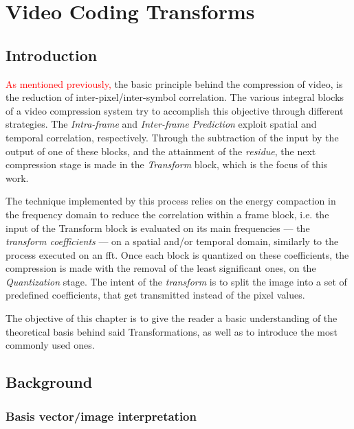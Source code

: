 \cleardoublepage
\chapter{Video Coding Transforms}

\section{{Introduction}}

\textcolor{red}{As mentioned previously,} the basic principle behind the compression of video, is the reduction of inter-pixel/inter-symbol correlation. The various integral blocks of a video compression system try to accomplish this objective through different strategies. The \emph{Intra-frame} and \emph{Inter-frame Prediction} exploit spatial and temporal correlation, respectively. Through the subtraction of the input by the output of one of these blocks, and the attainment of the \emph{residue}, the next compression stage is made in the \emph{Transform} block, which is the focus of this work.


The technique implemented by this process relies on the energy compaction in the frequency domain to reduce the correlation within a frame block, i.e. the input of the Transform block is evaluated on its main frequencies --- the \emph{transform coefficients} --- on a spatial and/or temporal domain, similarly to the process executed on an \gls{fft}. Once each block is quantized on these coefficients, the compression is made with the removal of the least significant ones, on the \emph{Quantization} stage. The intent of the \emph{transform} is to split the image into a set of predefined coefficients, that get transmitted instead of the pixel values.

The objective of this chapter is to give the reader a basic understanding of the theoretical basis behind said Transformations, as well as to introduce the most commonly used ones. 

\section{Background}
\subsection{Basis vector/image interpretation}

